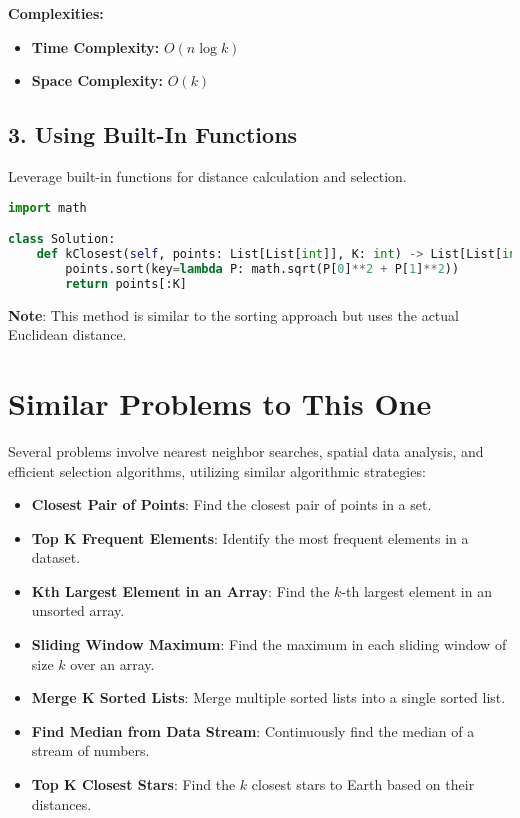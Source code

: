 \textbf{Complexities:}
\begin{itemize}
    \item \textbf{Time Complexity:} \(O(n \log k)\)
    \item \textbf{Space Complexity:} \(O(k)\)
\end{itemize}

\subsection*{3. Using Built-In Functions}

Leverage built-in functions for distance calculation and selection.

\begin{lstlisting}[language=Python]
import math

class Solution:
    def kClosest(self, points: List[List[int]], K: int) -> List[List[int]]:
        points.sort(key=lambda P: math.sqrt(P[0]**2 + P[1]**2))
        return points[:K]
\end{lstlisting}

\textbf{Note}: This method is similar to the sorting approach but uses the actual Euclidean distance.

\section*{Similar Problems to This One}

Several problems involve nearest neighbor searches, spatial data analysis, and efficient selection algorithms, utilizing similar algorithmic strategies:

\begin{itemize}
    \item \textbf{Closest Pair of Points}: Find the closest pair of points in a set.
    \item \textbf{Top K Frequent Elements}: Identify the most frequent elements in a dataset.
    \item \textbf{Kth Largest Element in an Array}: Find the \(k\)-th largest element in an unsorted array.
    \item \textbf{Sliding Window Maximum}: Find the maximum in each sliding window of size \(k\) over an array.
    \item \textbf{Merge K Sorted Lists}: Merge multiple sorted lists into a single sorted list.
    \item \textbf{Find Median from Data Stream}: Continuously find the median of a stream of numbers.
    \item \textbf{Top K Closest Stars}: Find the \(k\) closest stars to Earth based on their distances.
\end{itemize}

